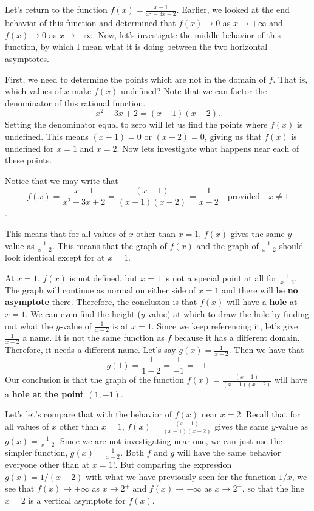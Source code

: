 \documentclass{ximera}
\begin{document}
\begin{example}
Let's return to the function $f(x) = \frac{x-1}{x^2-3x+2}$.  Earlier, we looked at the end behavior of this function and determined that $f(x) \to 0$ as $x \to +\infty$ and $f(x) \to 0$ as $x \to -\infty$.  Now, let's investigate the middle behavior of this function, by which I mean what it is doing between the two horizontal asymptotes.

First, we need to determine the points which are not in the domain of $f$.  That is, which values of $x$ make $f(x)$ undefined?  Note that we can factor the denominator of this rational function.  
$$x^2-3x+2 = (x-1)(x-2).$$
Setting the denominator equal to zero will let us find the points where $f(x)$ is undefined.  This means $(x-1)=0$ or $(x-2)=0$, giving us that $f(x)$ is undefined for $x=1$ and $x=2$. Now lets investigate what happens near each of these points.

Notice that we may write that $$   f(x) = \frac{x-1}{x^2-3x+2} = \frac{(x-1)}{(x-1)(x-2)} = \frac{1}{x-2} \quad \text{provided} \quad x \neq 1$$. 

This means that for all values of $x$ other than $x=1$, $f(x)$ gives the same $y$-value as $\frac{1}{x-2}$.  This means that the graph of $f(x)$ and the graph of $\frac{1}{x-2}$ should look identical except for at $x=1$.  

At $x=1$, $f(x)$ is not defined, but $x=1$ is not a special point at all for $\frac{1}{x-2}$.  The graph will continue as normal on either side of $x=1$ and there will be \textbf{no asymptote} there.  Therefore, the conclusion is that $f(x)$ will have a \textbf{hole} at $x=1$.   We can even find the height ($y$-value) at which to draw the hole by finding out what the $y$-value of $\frac{1}{x-2}$ is at $x=1$.  Since we keep referencing it, let's give $\frac{1}{x-2}$ a name.  It is not the same function as $f$ because it has a different domain.  Therefore, it needs a different name.  Let's say $g(x)=\frac{1}{x-2}$.  Then we have that 
$$g(1)=\frac{1}{1-2}=\frac{1}{-1}=-1.$$
Our conclusion is that the graph of the function $f(x)=\frac{(x-1)}{(x-1)(x-2)}$ will have a \textbf{hole at the point $(1,-1)$}.

Let's let's compare that with the behavior of $f(x)$ near $x=2$.  Recall that for all values of $x$ other than $x=1$, $f(x)=\frac{(x-1)}{(x-1)(x-2)}$ gives the same $y$-value as $g(x)=\frac{1}{x-2}$.  Since we are not investigating near one, we can just use the simpler function, $g(x)=\frac{1}{x-2}$.  Both $f$ and $g$ will have the same behavior everyone other than at $x=1$!.  But comparing the expression $g(x) = 1/(x-2)$ with what we have previously seen for the function $1/x$, we see that $f(x) \to +\infty$ as $x \to 2^+$ and $f(x) \to -\infty$ as $x \to 2^-$, so that the line $x=2$ is a vertical asymptote for $f(x)$. 
\end{example}
\end{document}
